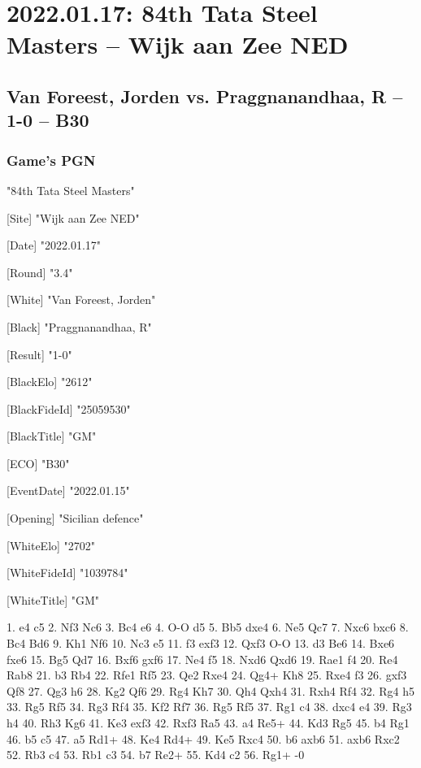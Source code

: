 \documentclass[9pt]{extarticle}
\begin{document}
\section*{2022.01.17: 84th Tata Steel Masters -- Wijk aan Zee NED}

\subsection*{Van Foreest, Jorden vs. Praggnanandhaa, R -- 1-0 -- B30}
\subsubsection*{Game's PGN}
\begin{flushleft}
[Event] "84th Tata Steel Masters"

[Site] "Wijk aan Zee NED"

[Date] "2022.01.17"

[Round] "3.4"

[White] "Van Foreest, Jorden"

[Black] "Praggnanandhaa, R"

[Result] "1-0"

[BlackElo] "2612"

[BlackFideId] "25059530"

[BlackTitle] "GM"

[ECO] "B30"

[EventDate] "2022.01.15"

[Opening] "Sicilian defence"

[WhiteElo] "2702"

[WhiteFideId] "1039784"

[WhiteTitle] "GM"

\end{flushleft}
\begin{flushleft}
1. e4 c5 2. Nf3 Nc6 3. Bc4 e6 4. O-O d5 5. Bb5 dxe4 6. Ne5 Qc7 7. Nxc6 bxc6 8. Bc4 Bd6 9. Kh1 Nf6 10. Nc3 e5 11. f3 exf3 12. Qxf3 O-O 13. d3 Be6 14. Bxe6 fxe6 15. Bg5 Qd7 16. Bxf6 gxf6 17. Ne4 f5 18. Nxd6 Qxd6 19. Rae1 f4 20. Re4 Rab8 21. b3 Rb4 22. Rfe1 Rf5 23. Qe2 Rxe4 24. Qg4+ Kh8 25. Rxe4 f3 26. gxf3 Qf8 27. Qg3 h6 28. Kg2 Qf6 29. Rg4 Kh7 30. Qh4 Qxh4 31. Rxh4 Rf4 32. Rg4 h5 33. Rg5 Rf5 34. Rg3 Rf4 35. Kf2 Rf7 36. Rg5 Rf5 37. Rg1 c4 38. dxc4 e4 39. Rg3 h4 40. Rh3 Kg6 41. Ke3 exf3 42. Rxf3 Ra5 43. a4 Re5+ 44. Kd3 Rg5 45. b4 Rg1 46. b5 c5 47. a5 Rd1+ 48. Ke4 Rd4+ 49. Ke5 Rxc4 50. b6 axb6 51. axb6 Rxc2 52. Rb3 c4 53. Rb1 c3 54. b7 Re2+ 55. Kd4 c2 56. Rg1+ \quad  {}-0
\end{flushleft}
\end{document}
